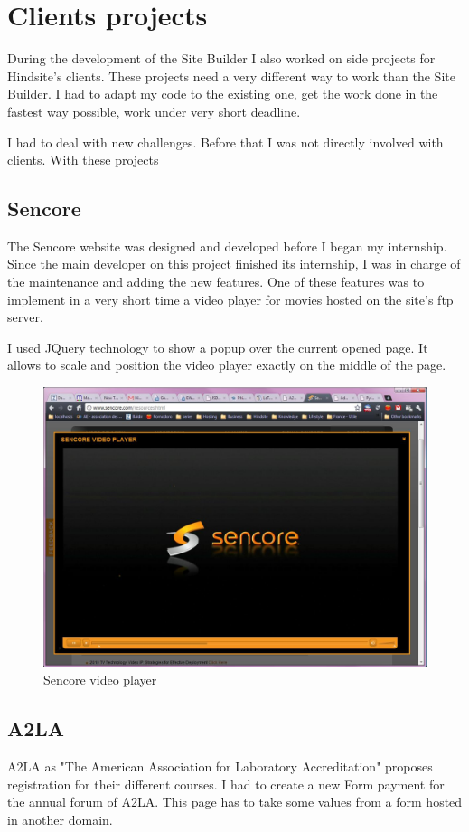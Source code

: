 \chapter{Clients projects}

During the development of the Site Builder I also worked on side projects for Hindsite's clients.
These projects need a very different way to work than the Site Builder. I had to adapt my code to the existing one, 
get the work done in the fastest way possible, work under very short deadline.

I had to deal with new challenges. Before that I was not directly involved with clients. With these projects 


\section{Sencore}

The Sencore website was designed and developed before I began my internship. Since the main developer on this project finished its internship, I was in charge of the maintenance and adding the new features. One of these features was to implement in a very short time a video player for movies hosted on the site's ftp server.

I used JQuery technology to show a popup over the current opened page. It allows to scale and position the video player exactly on the middle of the page. 

\begin{figure}[!ht]
\centering
\includegraphics[width=.55\textwidth]{img/sencore_video.jpg}
\caption{Sencore video player}
\label{figure:sencore_video}
\end{figure}

\section{A2LA}

A2LA as "The American Association for Laboratory Accreditation" proposes registration for their different courses. 
I had to create a new Form payment for the annual forum of A2LA. This page has to take some values from a form hosted in another domain. 

